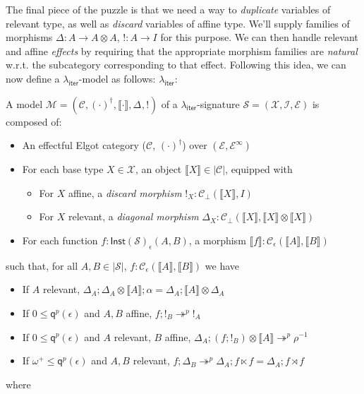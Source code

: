 \documentclass[acmsmall,screen,review]{acmart}
\newcommand{\mc}[1]{\ensuremath{\mathcal{#1}}}
\newcommand{\ms}[1]{\ensuremath{\mathsf{#1}}}
\newcommand{\cref}{\twoheadrightarrow}
\newcommand{\dnt}[1]{\llbracket{#1}\rrbracket}
\newcommand{\tmor}[1]{{!}_{#1}}
\newcommand{\dmor}[1]{{\Delta}_{#1}}
\newcommand{\subiterexp}{\texorpdfstring{\(\lambda_{\ms{iter}}\)}{lambda-iter}}
\newcommand{\zeroq}{0}
\newcommand{\cpyq}{\omega^+}
\newcommand{\alquant}{\ms{q}}
\begin{document}
The final piece of the puzzle is that we need a way to \emph{duplicate} variables of relevant type,
as well as \emph{discard} variables of affine type. We'll supply families of morphisms $\Delta: A
\to A \otimes A$, $!: A \to I$ for this purpose. We can then handle relevant and affine
\emph{effects} by requiring that the appropriate morphism families are \emph{natural} w.r.t. the
subcategory corresponding to that effect. Following this idea, we can now define a \subiterexp-model
as follows: \subiterexp{}:
\begin{definition}[\subiterexp-model]
  A model $\mc{M} = (\mc{C}, (\cdot)^\dagger, \dnt{\cdot}, \dmor{}, \tmor{})$ of a
  \subiterexp-signature $\mc{S} = (\mc{X}, \mc{I}, \mc{E})$ is composed of:
  \begin{itemize}
    \item An effectful Elgot category ($\mc{C}$, $(\cdot)^\dagger$) over $(\mc{E},
    \mc{E}^\infty)$
    \item For each base type $X \in \mc{X}$, an object $\dnt{X} \in |\mc{C}|$, equipped with
    \begin{itemize}
      \item For $X$ affine, a \emph{discard morphism} $\tmor{X} : \mc{C}_\bot(\dnt{X}, I)$
      \item For $X$ relevant, a \emph{diagonal morphism} $\dmor{X} : \mc{C}_\bot(\dnt{X}, \dnt{X}
      \otimes \dnt{X})$
    \end{itemize}
    \item For each function $f : \ms{Inst}(\mc{S})_\epsilon(A, B)$, a morphism $\dnt{f} :
    \mc{C}_\epsilon(\dnt{A}, \dnt{B})$
  \end{itemize}
  such that, for all $A, B \in |\mc{S}|$, $f : \mc{C}_\epsilon(\dnt{A}, \dnt{B})$ we have
  \begin{itemize}
    \item If $A$ relevant, 
      $\dmor{A} ; \dmor{A} \otimes \dnt{A} ; \alpha = \dmor{A} ; \dnt{A} \otimes \dmor{A}$
    \item If $\zeroq \leq \alquant^p(\epsilon)$ and $A, B$ affine, $f ; !_B \cref^p !_A$
    \item If $\zeroq \leq \alquant^p(\epsilon)$ and $A$ relevant, $B$ affine, 
      $\dmor{A} ; (f ; !_B) \otimes \dnt{A} \cref^p \rho^{-1}$
    \item If $\cpyq \leq \alquant^p(\epsilon)$ and $A, B$ relevant, 
    $f ; \dmor{B} \cref^p \dmor{A} ; f \ltimes f = \dmor{A} ; f \rtimes f$
  \end{itemize}
  where
  \begin{itemize}

\end{itemize}
\end{definition}
\end{document}
